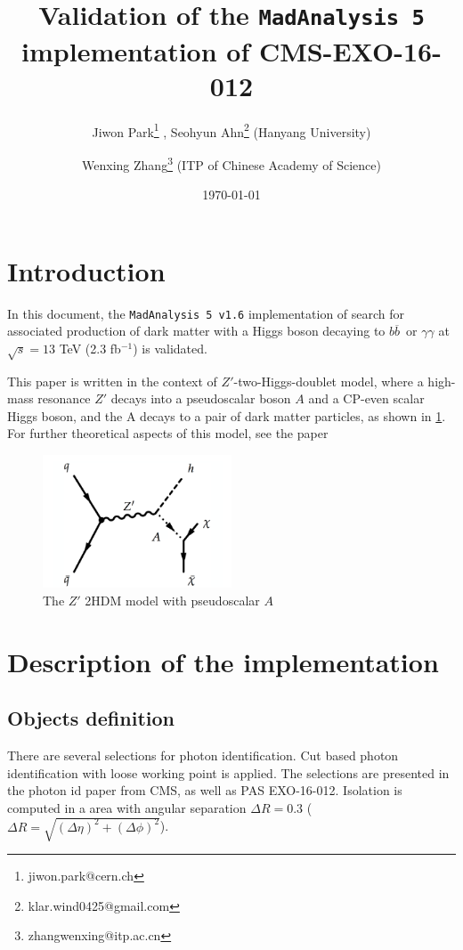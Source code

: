 \documentclass[12pt,A4paper]{article}
\title{Validation of the \texttt{MadAnalysis 5} implementation of CMS-EXO-16-012}
\author{Jiwon Park\footnote{jiwon.park@cern.ch} , Seohyun Ahn\footnote{klar.wind0425@gmail.com} (Hanyang University) \and Wenxing Zhang\footnote{zhangwenxing@itp.ac.cn} (ITP of Chinese Academy of Science)\\ 
\date{\today}
}
\newcommand{\xspace}{~}
\newcommand{\bbbar}{\ensuremath{b\overline{b}}\xspace} %
\begin{document}
        \maketitle

\section{Introduction}
\indent In this document, the \texttt{MadAnalysis 5 v1.6} \cite{ref:ma51,ref:ma52,ref:ma53} implementation of search for associated production of dark matter with a
Higgs boson decaying to \bbbar or $\gamma\gamma$ at $\sqrt{s} = 13$ TeV (2.3 fb$^{-1}$)\cite{ref:paper} is validated.

 This paper is written in the context of $Z'$-two-Higgs-doublet model, where a high-mass resonance $Z'$ decays into a pseudoscalar boson $A$ and a CP-even scalar Higgs boson, and the A decays to a pair of dark matter particles, as shown in \ref{fig:model1}. For further theoretical aspects of this model, see the paper \cite{ref:theory}

\begin{figure}[h!]
    \centering
    \includegraphics[width=0.5\textwidth]{img/model_fig1.png}
    \caption{The $Z'$ 2HDM model with pseudoscalar $A$}
    \label{fig:model1}
\end{figure}

\section{Description of the implementation}
\subsection{Objects definition}
There are several selections for photon identification. Cut based photon identification with loose working point is applied. The selections are presented in the photon id paper from CMS, as well as PAS EXO-16-012\cite{ref:photonid, ref:paper}. Isolation is computed in a area with angular separation $\Delta R = 0.3$ ($\Delta R = \sqrt{(\Delta\eta)^2+(\Delta\phi)^2}$). 
\end{document}
